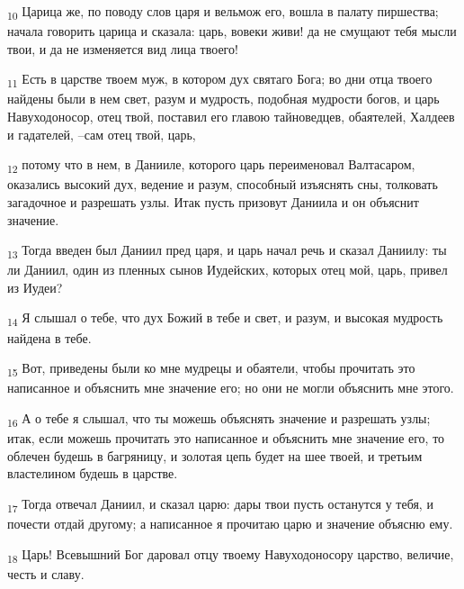 \begin{tcolorbox}
\textsubscript{10} Царица же, по поводу слов царя и вельмож его, вошла в палату пиршества; начала говорить царица и сказала: царь, вовеки живи! да не смущают тебя мысли твои, и да не изменяется вид лица твоего!
\end{tcolorbox}
\begin{tcolorbox}
\textsubscript{11} Есть в царстве твоем муж, в котором дух святаго Бога; во дни отца твоего найдены были в нем свет, разум и мудрость, подобная мудрости богов, и царь Навуходоносор, отец твой, поставил его главою тайноведцев, обаятелей, Халдеев и гадателей, --сам отец твой, царь,
\end{tcolorbox}
\begin{tcolorbox}
\textsubscript{12} потому что в нем, в Данииле, которого царь переименовал Валтасаром, оказались высокий дух, ведение и разум, способный изъяснять сны, толковать загадочное и разрешать узлы. Итак пусть призовут Даниила и он объяснит значение.
\end{tcolorbox}
\begin{tcolorbox}
\textsubscript{13} Тогда введен был Даниил пред царя, и царь начал речь и сказал Даниилу: ты ли Даниил, один из пленных сынов Иудейских, которых отец мой, царь, привел из Иудеи?
\end{tcolorbox}
\begin{tcolorbox}
\textsubscript{14} Я слышал о тебе, что дух Божий в тебе и свет, и разум, и высокая мудрость найдена в тебе.
\end{tcolorbox}
\begin{tcolorbox}
\textsubscript{15} Вот, приведены были ко мне мудрецы и обаятели, чтобы прочитать это написанное и объяснить мне значение его; но они не могли объяснить мне этого.
\end{tcolorbox}
\begin{tcolorbox}
\textsubscript{16} А о тебе я слышал, что ты можешь объяснять значение и разрешать узлы; итак, если можешь прочитать это написанное и объяснить мне значение его, то облечен будешь в багряницу, и золотая цепь будет на шее твоей, и третьим властелином будешь в царстве.
\end{tcolorbox}
\begin{tcolorbox}
\textsubscript{17} Тогда отвечал Даниил, и сказал царю: дары твои пусть останутся у тебя, и почести отдай другому; а написанное я прочитаю царю и значение объясню ему.
\end{tcolorbox}
\begin{tcolorbox}
\textsubscript{18} Царь! Всевышний Бог даровал отцу твоему Навуходоносору царство, величие, честь и славу.
\end{tcolorbox}
